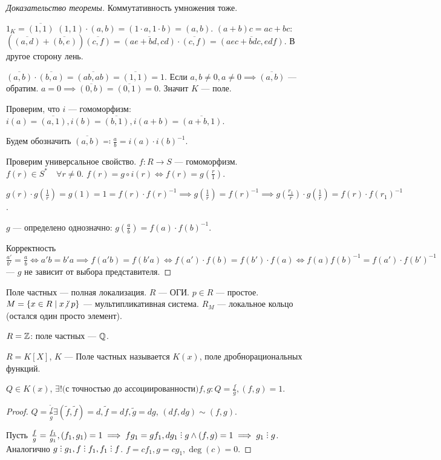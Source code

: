 \begin{proof}[Доказательство теоремы]
    Коммутативность умножения тоже.

    $1_K = \overline{(1, 1)}$  $(1, 1) \cdot (a, b) = (1 \cdot a, 1 \cdot b) = (a, b)$. 
    $(a+b)c = ac+bc$:  $(\overline{(a, d)} + \overline{(b, e)}) \overline{(c, f)} = \overline{(ae + bd, cd)} \cdot \overline{(c, f)} = \overline{(aec + bdc, edf)}$. В другое сторону лень.

     $\overline{(a, b)} \cdot \overline{(b, a)} = \overline{(ab, ab)} = \overline{(1, 1)} = 1$. Если  $a, b \neq 0, a \neq 0 \implies \overline{(a, b)}$ --- обратим.  $a = 0 \implies \overline{(0, b)} = \overline{(0, 1)} = 0$. Значит $K$ --- поле.

     Проверим, что  $i$ --- гомоморфизм:  $i(a) = \overline{(a, 1)}, i(b) = \overline{(b, 1)}, i(a+b) = \overline{(a+b, 1)}$.

     Будем обозначить  $\overline{(a, b)} \eqqcolon \frac{a}{b} = i(a) \cdot i(b)^{-1}$.

     Проверим универсальное свойство. $f\!: R \to S$ --- гомоморфизм.  $f(r) \in S^* \quad \forall r \neq 0$.  $f(r) = g \circ i(r) \iff f(r) = g(\frac{r}{1})$.

     $g(r) \cdot g(\frac{1}{r}) = g(1) = 1 = f(r) \cdot f(r)^{-1} \implies g(\frac{1}{r}) = f(r)^{-1} \implies g(\frac{r_1}{r}) \cdot g(\frac{1}{r}) = f(r) \cdot f(r_1)^{-1}$. 

     $g$ --- определено однозначно:  $g(\frac{a}{b}) = f(a) \cdot f(b)^{-1}$. 

     Корректность $\frac{a'}{b'} = \frac{a}{b} \iff a'b = b'a \implies f(a'b) = f(b'a) \iff f(a') \cdot f(b) = f(b') \cdot f(a) \iff f(a) f(b)^{-1} = f(a') \cdot f(b')^{-1}$--- $g$ не зависит от выбора представителя.
\end{proof}
\begin{example}
    Поле частных --- полная локализация.  $R$ --- ОГИ.  $p \in R$ --- простое.  $M = \{ x \in R \mid x \centernot \divby p\}$ --- мультипликативная система.  $R_M$ --- локальное кольцо (остался один просто элемент).
\end{example}
\begin{example}
    $R = \mathbb{Z}$: поле частных ---  $\mathbb{Q}$. 

    $R = K[X]$,  $K$ --- Поле частных называется  $K(x)$, поле дробнорациональных  функций.
\end{example}
\begin{remark}
    $Q \in K(x)$,  $\exists!\text{(с точностью до ассоциированности)} f,g\!: Q = \frac{f}{g}, (f, g) = 1$.
\end{remark}
\begin{proof}
    $Q = \frac{\widetilde{f}}{\widetilde{g}} \exists(\widetilde{f}, \widetilde{f}) = d, \widetilde{f} = df, \widetilde{g} = dg$, $(df, dg) \sim (f, g)$.

    Пусть  $\frac{f}{g} = \frac{f_1}{g_1}, (f_1, g_1) = 1 \implies fg_1 = gf_1, dg_1 \divby g \land (f, g) = 1 \implies g_1 \divby g$. Аналогично $g \divby g_1, f \divby f_1, f_1 \divby f$. $f = cf_1, g = cg_1, \deg(c) = 0$.
\end{proof}

